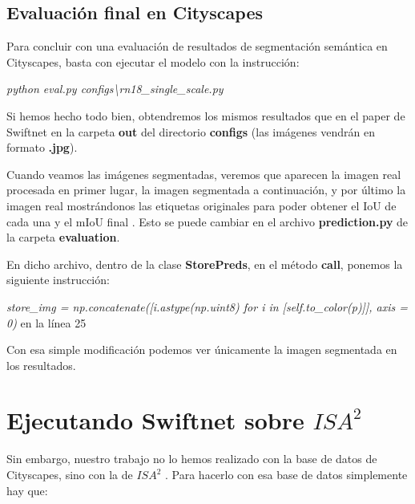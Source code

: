 \subsection{Evaluación final en Cityscapes}

Para concluir con una evaluación de resultados de segmentación semántica en Cityscapes, basta con ejecutar el modelo con la instrucción:

\begin{center}
\textit{python eval.py configs\textbackslash{rn18\_single\_scale.py}}
\end{center}

Si hemos hecho todo bien, obtendremos los mismos resultados que en el paper de Swiftnet \cite{swiftnet} en la carpeta \textbf{out} del directorio \textbf{configs} (las imágenes vendrán en formato \textbf{.jpg}).

Cuando veamos las imágenes segmentadas, veremos que aparecen la imagen real procesada en primer lugar, la imagen segmentada a continuación, y por último la imagen real mostrándonos las etiquetas originales para poder obtener el \ac{IoU} de cada una y el \ac{mIoU} final \cite{miou-iou}. Esto se puede cambiar en el archivo \textbf{prediction.py} de la carpeta \textbf{evaluation}.

En dicho archivo, dentro de la clase \textbf{StorePreds}, en el método \textbf{call}, ponemos la siguiente instrucción:

\begin{center}
\textit{store\_img = np.concatenate([i.astype(np.uint8) for i in [self.to\_color(p)]], axis = 0)} en la línea 25
\end{center}

Con esa simple modificación podemos ver únicamente la imagen segmentada en los resultados.

\section{Ejecutando Swiftnet sobre $ISA^{2}$}
Sin embargo, nuestro trabajo no lo hemos realizado con la base de datos de Cityscapes, sino con la de $ISA^{2}$ \cite{isa2}. Para hacerlo con esa base de datos simplemente hay que:

